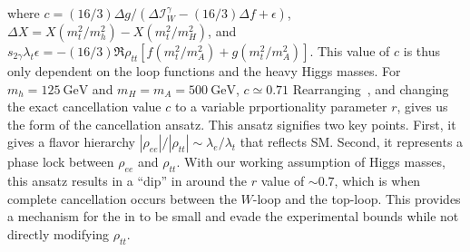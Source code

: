 where \(c = (16/3)\Delta g /(\Delta \mathcal{I}_{W}^{\gamma}-(16/3)\Delta f + \epsilon) \), 
\(\Delta X = X(m_{t}^{2}/m_{h}^{2}) - X(m_{t}^{2}/m_{H}^{2}) \), 
and \(s_{2\gamma}\lambda_{t}\epsilon = -(16/3)\Re{\rho_{tt}}[f(m_{t}^{2}/m_{A}^{2})+g(m_{t}^{2}/m_{A}^{2})] \).
This value of \(c \) is thus only dependent on the loop functions and the heavy Higgs masses.
For \(m_{h} = \SI{125}{\GeV} \) and \(m_{H} = m_{A} = \SI{500}{\GeV } \), \(c \simeq 0.71 \)
Rearranging~,
and changing the exact cancellation value \(c \) to a variable prportionality parameter \(r \),
gives us the form of the cancellation ansatz.
This ansatz signifies two key points.
First, it gives a flavor hierarchy \(|\rho_{ee}|/|\rho_{tt}|\sim\lambda_{e}/\lambda_{t} \) that reflects SM.
Second, it represents a phase lock between \(\rho_{ee} \) and \(\rho_{tt} \).
With our working assumption of Higgs masses, this ansatz results in a ``dip'' in {\eedm} around the \(r \) value of \(\sim 0.7 \),
which is when complete cancellation occurs between the \(W \)-loop and the top-loop.
This provides a mechanism for the {\eedm} in {\gthdm} to be small and evade the experimental bounds while not directly modifying \(\rho_{tt} \).

